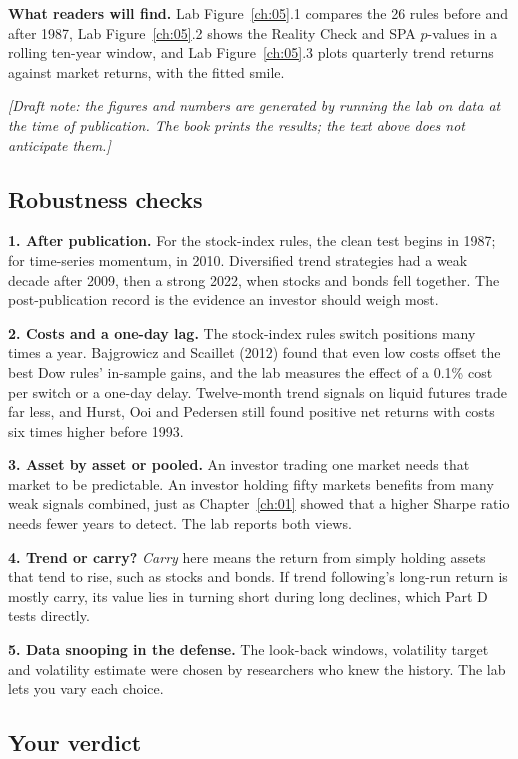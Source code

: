 \textbf{What readers will find.} Lab Figure~\ref{ch:05}.1 compares the 26 rules before and after 1987, Lab Figure~\ref{ch:05}.2 shows the Reality Check and SPA $p$-values in a rolling ten-year window, and Lab Figure~\ref{ch:05}.3 plots quarterly trend returns against market returns, with the fitted smile.

\emph{[Draft note: the figures and numbers are generated by running the lab on data at the time of publication. The book prints the results; the text above does not anticipate them.]}

\subsection{Robustness checks}
\label{sec:08-stress}

\textbf{1. After publication.} For the stock-index rules, the clean test begins in 1987; for time-series momentum, in 2010. Diversified trend strategies had a weak decade after 2009, then a strong 2022, when stocks and bonds fell together. The post-publication record is the evidence an investor should weigh most.

\textbf{2. Costs and a one-day lag.} The stock-index rules switch positions many times a year. Bajgrowicz and Scaillet (2012) found that even low costs offset the best Dow rules' in-sample gains, and the lab measures the effect of a 0.1\% cost per switch or a one-day delay. Twelve-month trend signals on liquid futures trade far less, and Hurst, Ooi and Pedersen still found positive net returns with costs six times higher before 1993.

\textbf{3. Asset by asset or pooled.} An investor trading one market needs that market to be predictable. An investor holding fifty markets benefits from many weak signals combined, just as Chapter~\ref{ch:01} showed that a higher Sharpe ratio needs fewer years to detect. The lab reports both views.

\textbf{4. Trend or carry?} \emph{Carry} here means the return from simply holding assets that tend to rise, such as stocks and bonds. If trend following's long-run return is mostly carry, its value lies in turning short during long declines, which Part D tests directly.

\textbf{5. Data snooping in the defense.} The look-back windows, volatility target and volatility estimate were chosen by researchers who knew the history. The lab lets you vary each choice.

\subsection*{Your verdict}


